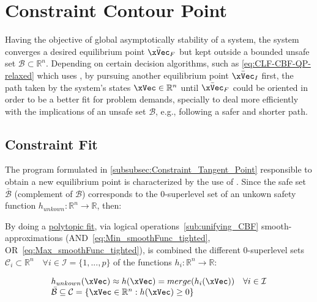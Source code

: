 \newpage %


\section{Constraint Contour Point}
\label{sec:Constraint_Contour_Point}

Having the objective of global asymptotically  stability of a system, the system converges a desired equilibrium point \(\bar{\xVec}_F\) but kept outside a bounded unsafe set \(\mathcal{B} \subset \mathbb{R}^n\). Depending on certain decision algorithms, such as \ref{eq:CLF-CBF-QP-relaxed} which uses , by pursuing another equilibrium point \(\bar{\xVec}_I\) first, the path taken by the system's states \(\xVec \in \mathbb{R}^n\) until \(\bar{\xVec}_F\) could be oriented in order to be a better fit for problem demands, specially to deal more efficiently with the implications of an unsafe set \(\mathcal{B}\), e.g., following a safer and shorter path.\\

\subsection{Constraint Fit}
\label{subsec:Constraint_Fit}

The program formulated in \ref{subsubsec:Constraint_Tangent_Point} responsible to obtain a new equilibrium point is characterized by the use of . Since the safe set \(\bar{\mathcal{B}}\) (complement of \(\mathcal{B}\)) corresponds to the 0-superlevel set of an unkown safety function \(h_{unkown}: \mathbb{R}^n \to \mathbb{R}\), then:

By doing a \underline{polytopic fit}, via logical operations~\ref{sub:unifying_CBF} smooth-approximations (AND~\ref{eq:Min_smoothFunc_tighted}, OR~\ref{eq:Max_smoothFunc_tighted}), is combined the different 0-superlevel sets \(\mathcal{C}_i \subset \mathbb{R}^n \quad \forall i \in \mathcal{I} = \{1,...,p\}\) of the functions \(h_i: \mathbb{R}^n \to \mathbb{R}\):

\begin{equation}
    \begin{array}{l}
        h_{unkown}(\xVec) \approx h(\xVec) = merge(h_i(\xVec)) \quad \forall i \in \mathcal{I} \\
        \bar{\mathcal{B}} \subseteq \mathcal{C} = \{\xVec \in \mathbb{R}^n: h(\xVec) \geq 0\}
    \end{array}
    \label{eq:Polytope_fit}
\end{equation}

